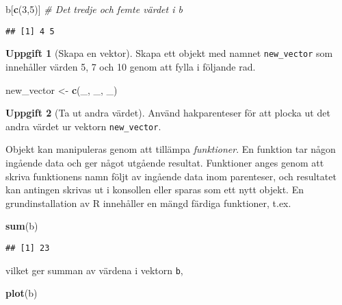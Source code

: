\documentclass[
]{book}
\newenvironment{Shaded}{\begin{snugshade}}{\end{snugshade}}
\newcommand{\CommentTok}[1]{\textcolor[rgb]{0.56,0.35,0.01}{\textit{#1}}}
\newcommand{\DecValTok}[1]{\textcolor[rgb]{0.00,0.00,0.81}{#1}}
\newcommand{\FunctionTok}[1]{\textcolor[rgb]{0.13,0.29,0.53}{\textbf{#1}}}
\newcommand{\NormalTok}[1]{#1}
\newcommand{\OtherTok}[1]{\textcolor[rgb]{0.56,0.35,0.01}{#1}}
\theoremstyle{definition}
\theoremstyle{definition}
\theoremstyle{definition}
\newtheorem{exercise}{Uppgift}[chapter]
\theoremstyle{definition}
\theoremstyle{remark}
\begin{document}
\begin{Shaded}
\begin{Highlighting}[]
\NormalTok{b[}\FunctionTok{c}\NormalTok{(}\DecValTok{3}\NormalTok{,}\DecValTok{5}\NormalTok{)]          }\CommentTok{\# Det tredje och femte värdet i b}
\end{Highlighting}
\end{Shaded}

\begin{verbatim}
## [1] 4 5
\end{verbatim}

\begin{exercise}[Skapa en vektor]

Skapa ett objekt med namnet \texttt{new\_vector} som innehåller värden 5, 7 och 10 genom att fylla i följande rad.

\begin{Shaded}
\begin{Highlighting}[]
\NormalTok{new\_vector }\OtherTok{\textless{}{-}} \FunctionTok{c}\NormalTok{(\_, \_, \_)}
\end{Highlighting}
\end{Shaded}

\end{exercise}

\begin{exercise}[Ta ut andra värdet]
Använd hakparenteser för att plocka ut det andra värdet ur vektorn \texttt{new\_vector}.
\end{exercise}

Objekt kan manipuleras genom att tillämpa \emph{funktioner}. En funktion tar någon ingående data och ger något utgående resultat. Funktioner anges genom att skriva funktionens namn följt av ingående data inom parenteser, och resultatet kan antingen skrivas ut i konsollen eller sparas som ett nytt objekt. En grundinstallation av R innehåller en mängd färdiga funktioner, t.ex.

\begin{Shaded}
\begin{Highlighting}[]
\FunctionTok{sum}\NormalTok{(b)}
\end{Highlighting}
\end{Shaded}

\begin{verbatim}
## [1] 23
\end{verbatim}

vilket ger summan av värdena i vektorn \texttt{b},

\begin{Shaded}
\begin{Highlighting}[]
\FunctionTok{plot}\NormalTok{(b)}
\end{Highlighting}
\end{Shaded}
\end{document}
